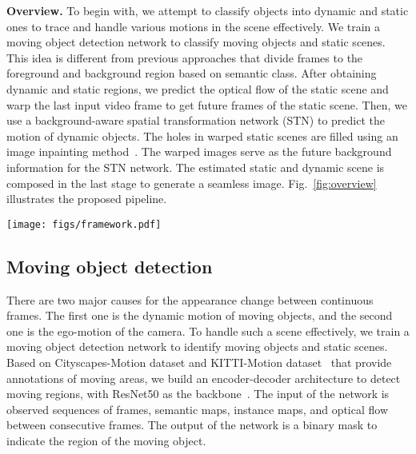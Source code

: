 \documentclass[10pt,twocolumn,letterpaper]{article}
\begin{document}
\vspace{2mm}
\noindent\textbf{Overview.}
To begin with, we attempt to classify objects into dynamic and static ones to trace and handle various motions in the scene effectively. 
We train a moving object detection network to classify moving objects and static scenes. 
This idea is different from previous approaches that divide frames to the foreground and background region based on semantic class.
After obtaining dynamic and static regions, we predict the optical flow of the static scene and warp the last input video frame to get future frames of the static scene. 
Then, we use a background-aware spatial transformation network (STN) to predict the motion of dynamic objects. The holes in warped static scenes are filled using an image inpainting method~\cite{yu2018generative}. The warped images serve as the future background information for the STN network. 
The estimated static and dynamic scene is composed in the last stage to generate a seamless image. Fig.~\ref{fig:overview} illustrates the proposed pipeline.





\begin{figure*}[t!]
\hspace{-4mm}
\centering
\texttt{[image: figs/framework.pdf]}
\vspace{1mm}
\caption{
Overview of the proposed architecture. We use a dynamic object detection model $M$ to separate moving objects and static background. The missing foreground area in the generated future background is inpainted using the inpainting model $I$. By providing the background images for the future, we apply a spatial transformer to predict moving objects. After that, we composite the foreground and background images and use a video inpainting module $V$ to inpaint occluded area.
}
\label{fig:overview}
\end{figure*}






\subsection{Moving object detection}
There are two major causes for the appearance change between continuous frames. The first one is the dynamic motion of moving objects, and the second one is the ego-motion of the camera. To handle such a scene effectively, we train a moving object detection network to identify moving objects and static scenes. Based on Cityscapes-Motion dataset and KITTI-Motion dataset~\cite{Valada_2017_IROS} that provide annotations of moving areas, we build an encoder-decoder architecture to detect moving regions, with ResNet50 as the backbone~\cite{resnet}. The input of the network is observed sequences of frames, semantic maps, instance maps, and optical flow between consecutive frames. The output of the network is a binary mask to indicate the region of the moving object.
\end{document}

